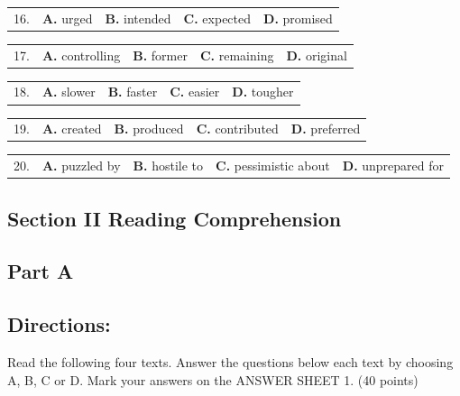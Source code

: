 \documentclass[UTF8,11pt]{ctexart}
\begin{document}
\noindent\begin{tabularx}{\linewidth}{@{}lXXXX@{}}16. & \textbf{A.} urged & \textbf{B.} intended & \textbf{C.} expected & \textbf{D.} promised\\\end{tabularx}\par

\noindent\begin{tabularx}{\linewidth}{@{}lXXXX@{}}17. & \textbf{A.} controlling & \textbf{B.} former & \textbf{C.} remaining & \textbf{D.} original\\\end{tabularx}\par

\noindent\begin{tabularx}{\linewidth}{@{}lXXXX@{}}18. & \textbf{A.} slower & \textbf{B.} faster & \textbf{C.} easier & \textbf{D.} tougher\\\end{tabularx}\par

\noindent\begin{tabularx}{\linewidth}{@{}lXXXX@{}}19. & \textbf{A.} created & \textbf{B.} produced & \textbf{C.} contributed & \textbf{D.} preferred\\\end{tabularx}\par

\noindent\begin{tabularx}{\linewidth}{@{}lXXXX@{}}20. & \textbf{A.} puzzled by & \textbf{B.} hostile to & \textbf{C.} pessimistic about & \textbf{D.} unprepared for\\\end{tabularx}\par

\subsection*{\textbf{Section II Reading Comprehension}}


\subsection*{\textbf{Part A}}


\subsection*{\textbf{Directions:}}


Read the following four texts. Answer the questions below each text by choosing A, B, C or D. Mark your answers on the ANSWER SHEET 1. (40 points)
\end{document}
